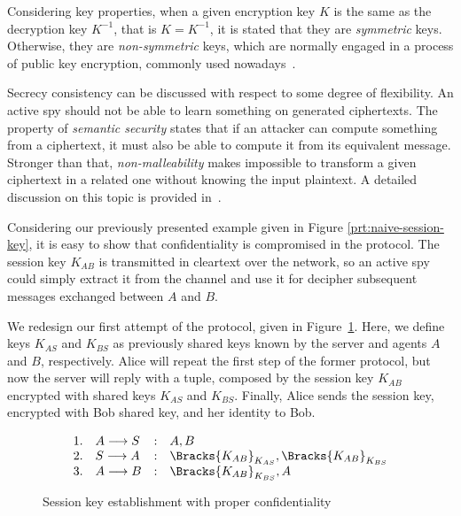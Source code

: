 Considering key properties, when a given encryption key \(K\) is the same as the decryption key \(K^{-1}\), that is \(K = K^{-1}\), it is stated that they are \emph{symmetric} keys. Otherwise, they are \emph{non-symmetric} keys, which are normally engaged in a process of public key encryption, commonly used nowadays~\cite{RyanSchneider2010}.

Secrecy consistency can be discussed with respect to some degree of flexibility. An active spy should not be able to learn something on generated ciphertexts. The property of \textit{semantic security} states that if an attacker can compute something from a ciphertext, it must also be able to compute it from its equivalent message. Stronger than that, \textit{non-malleability} makes impossible to transform a given ciphertext in a related one without knowing the input plaintext. A detailed discussion on this topic is provided in~\cite{Abadi99}.

Considering our previously presented example given in Figure \ref{prt:naive-session-key}, it is easy to show that confidentiality is compromised in the protocol. The session key \(K_{AB}\) is transmitted in cleartext over the network, so an active spy could simply extract it from the channel and use it for decipher subsequent messages exchanged between \(A\) and \(B\).

We redesign our first attempt of the protocol, given in Figure~\ref{prt:session-key-confidentiality}. Here, we define keys \(K_{AS}\) and \(K_{BS}\) as previously shared keys known by the server and agents \(A\) and \(B\), respectively. Alice will repeat the first step of the former protocol, but now the server will reply with a tuple, composed by the session key \(K_{AB}\) encrypted with shared keys \(K_{AS}\) and \(K_{BS}\). Finally, Alice sends the session key, encrypted with Bob shared key, and her identity to Bob.

\begin{figure}[ht]
  \centering
  \[
    \begin{array}{rlcl}
      1. & A \longrightarrow S &:& A, B \\
      2. & S \longrightarrow A &:& \Bracks{K_{AB}}_{K_{AS}}, \Bracks{K_{AB}}_{K_{BS}} \\
      3. & A \longrightarrow B &:& \Bracks{K_{AB}}_{K_{BS}},A \\
    \end{array}
  \]
  \caption{Session key establishment with proper confidentiality}
  \label{prt:session-key-confidentiality}
\end{figure}

